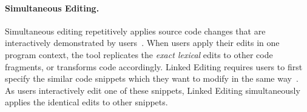 \begin{figure}
\centering
{}
\caption{}
\label{fig:lase}
\end{figure}



\paragraph{Simultaneous Editing.}
Simultaneous editing repetitively applies source code changes that are interactively demonstrated by users~\cite{MiM2001}. When users apply their edits in one program context, the tool replicates the \emph{exact lexical} edits to other code fragments, or transforms code accordingly. Linked Editing requires users to first specify the similar code snippets which they want to modify in the same way~\cite{TBG2004}. As users interactively edit one of these snippets, Linked Editing simultaneously applies the identical edits to other snippets. 

